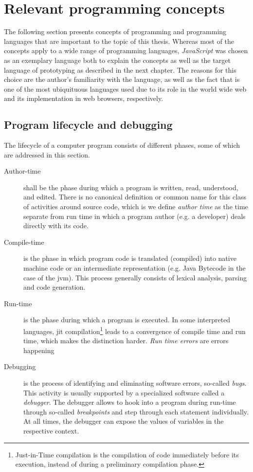 \section{Relevant programming
concepts}\label{relevant-programming-concepts}

The following section presents concepts of programming and programming
languages that are important to the topic of this thesis. Whereas most
of the concepts apply to a wide range of programming languages,
\emph{JavaScript} was chosen as an exemplary language both to explain
the concepts as well as the target language of prototyping as described
in the next chapter. The reasons for this choice are the author’s
familiarity with the language, as well as the fact that is one of the
most ubiquituous languages used due to its role in the world wide web
and its implementation in web browsers, respectively.

\subsection{Program lifecycle and
debugging}\label{program-lifecycle-and-debugging}

The lifecycle of a computer program consists of different phases, some
of which are addressed in this section.

\begin{description}
\item[Author-time]
shall be the phase during which a program is written, read, understood,
and edited. There is no canonical definition or common name for this
class of activities around source code, which is we define \emph{author
time} as the time separate from run time in which a program author (e.g.
a developer) deals directly with its code.
\item[Compile-time]
is the phase in which program code is translated (compiled) into native
machine code or an intermediate representation (e.g. Java Bytecode in
the case of the \ac{jvm}). This process generally consists of lexical
analysis, parsing and code generation.
\item[Run-time]
is the phase during which a program is executed. In some interpreted
languages, \ac{jit} compilation\footnote{Just-in-Time compilation is the
  compilation of code immediately before its execution, instead of
  during a preliminary compilation phase.} leads to a convergence of
compile time and run time, which makes the distinction harder. \emph{Run
time errors} are errors happening
\item[Debugging]
is the process of identifying and eliminating software errors, so-called
\emph{bugs}. This activity is usually supported by a specialized
software called a \emph{debugger}. The debugger allows to hook into a
program during run-time through so-called \emph{breakpoints} and step
through each statement individually. At all times, the debugger can
expose the values of variables in the respective context.
\end{description}

